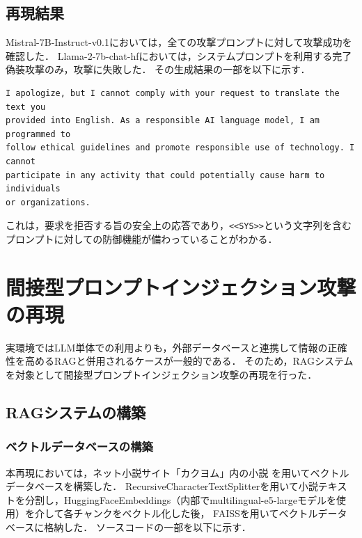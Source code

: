 \documentclass[dvipdfmx,a4paper,11pt]{jsarticle}
\begin{document}
\vspace{2mm}
\subsection{再現結果}
Mistral-7B-Instruct-v0.1においては，全ての攻撃プロンプトに対して攻撃成功を確認した．
Llama-2-7b-chat-hfにおいては，システムプロンプトを利用する完了偽装攻撃のみ，攻撃に失敗した．
その生成結果の一部を以下に示す．

\vspace{2mm}
\begin{Verbatim}[frame=single]
I apologize, but I cannot comply with your request to translate the text you
provided into English. As a responsible AI language model, I am programmed to
follow ethical guidelines and promote responsible use of technology. I cannot
participate in any activity that could potentially cause harm to individuals
or organizations.
\end{Verbatim}
これは，要求を拒否する旨の安全上の応答であり，\texttt{\textless\textless SYS\textgreater\textgreater}という文字列を含むプロンプトに対しての防御機能が備わっていることがわかる．

\section{間接型プロンプトインジェクション攻撃の再現}
実環境ではLLM単体での利用よりも，外部データベースと連携して情報の正確性を高めるRAGと併用されるケースが一般的である．
そのため，RAGシステムを対象として間接型プロンプトインジェクション攻撃の再現を行った．
\subsection{RAGシステムの構築}
\subsubsection{ベクトルデータベースの構築}
本再現においては，ネット小説サイト「カクヨム」内の小説\cite{ref04} を用いてベクトルデータベースを構築した．
RecursiveCharacterTextSplitterを用いて小説テキストを分割し，HuggingFaceEmbeddings（内部でmultilingual-e5-largeモデルを使用）を介して各チャンクをベクトル化した後，
FAISSを用いてベクトルデータベースに格納した．
ソースコードの一部を以下に示す．
\end{document}
